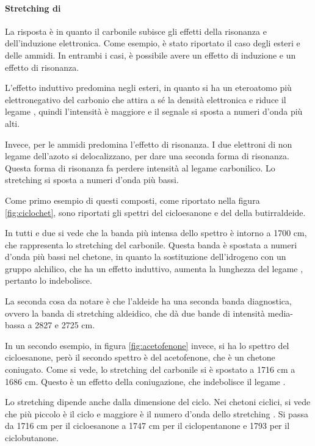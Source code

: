 \paragraph*{Stretching di }

La risposta è
in quanto il carbonile subisce gli effetti della risonanza e
dell'induzione elettronica.
Come esempio, è stato riportato il caso degli esteri e delle ammidi. In
entrambi i casi, è possibile avere un effetto di induzione e un effetto
di risonanza.

L'effetto induttivo predomina negli esteri, in quanto si ha un
eteroatomo più elettronegativo del carbonio che attira a sé la densità
elettronica e riduce il legame , quindi l'intensità è maggiore e il
segnale si sposta a numeri d'onda più alti.

Invece, per le ammidi predomina l'effetto di risonanza. I due elettroni
di non legame dell'azoto si delocalizzano, per dare una seconda forma di
risonanza. Questa forma di risonanza fa perdere intensità al legame
carbonilico. Lo stretching si sposta a numeri d'onda più bassi.

Come primo esempio di questi composti, come riportato nella figura \ref{fig:ciclochet}, sono riportati gli spettri del
cicloesanone e del della butirraldeide.


In tutti e due si vede che la banda più intensa dello spettro è intorno
a 1700 cm, che rappresenta lo stretching del carbonile. Questa banda è
spostata a numeri d'onda più bassi nel chetone, in quanto la
sostituzione dell'idrogeno con un gruppo alchilico, che ha un effetto
induttivo, aumenta la lunghezza del legame , pertanto lo indebolisce.

La seconda cosa da notare è che l'aldeide ha una seconda banda
diagnostica, ovvero la banda di stretching  aldeidico, che dà due
bande di intensità media-bassa a 2827 e 2725 cm.


In un secondo esempio, in figura \ref{fig:acetofenone} invece, si ha lo spettro del cicloesanone,
però il secondo spettro è del acetofenone, che è un chetone coniugato.
Come si vede, lo stretching del carbonile si è spostato a 1716 cm a
1686 cm. Questo è un effetto della coniugazione, che indebolisce il
legame .

Lo stretching  dipende anche dalla dimensione del ciclo. Nei chetoni
ciclici, si vede che più piccolo è il ciclo e maggiore è il numero
d'onda dello stretching . Si passa da 1716 cm per il cicloesanone a
1747 cm per il ciclopentanone e 1793 per il ciclobutanone.

